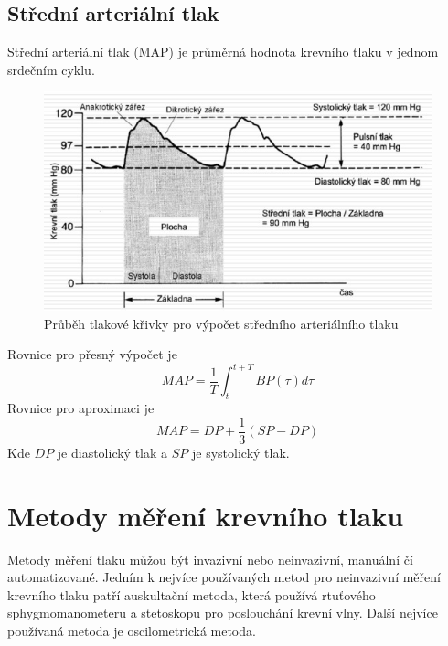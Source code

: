 \subsection{Střední arteriální tlak}
Střední arteriální tlak (MAP) je průměrná hodnota krevního tlaku v jednom srdečním cyklu.
\begin{figure}[H]
    \caption{Průběh tlakové křivky pro výpočet středního arteriálního tlaku \cite{cite:4}}
    \includegraphics[width=1\textwidth]{pictures/map.jpg}
\end{figure}
Rovnice pro přesný výpočet je
\begin{equation}
    MAP = \frac{1}{T} \int_{t}^{t + T} BP(\tau) d\tau
\end{equation}
Rovnice pro aproximaci je
\begin{equation}
    MAP = DP + \frac{1}{3}(SP - DP)
\end{equation}
Kde $DP$ je diastolický tlak a $SP$ je systolický tlak.
\section{Metody měření krevního tlaku}
Metody měření tlaku můžou být invazivní nebo neinvazivní, manuální čí automatizované. Jedním k nejvíce používaných metod pro neinvazivní měření
krevního tlaku patří auskultační metoda, která používá rtuťového sphygmomanometeru a stetoskopu pro poslouchání krevní vlny. Další nejvíce používaná metoda je oscilometrická metoda.
\cite{cite:Fabian}
